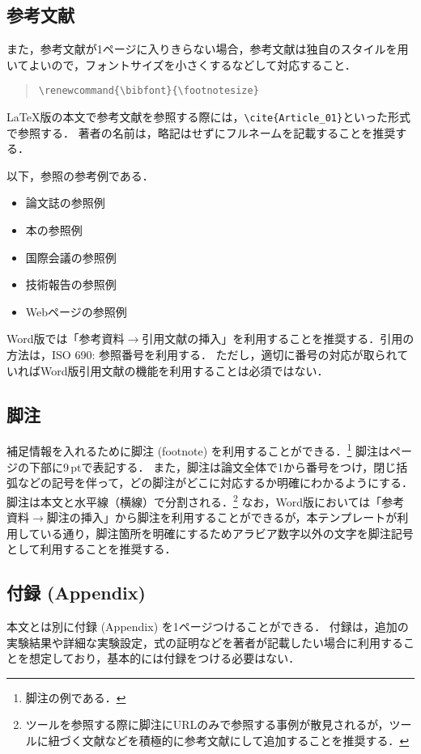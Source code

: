 \documentclass[
  platex, dvipdfmx,  %
]{nlp2024}
\begin{document}
\subsection{参考文献}



%
また，参考文献が1ページに入りきらない場合，参考文献は独自のスタイルを用いてよいので，フォントサイズを小さくするなどして対応すること．
\begin{quote}
\verb|\renewcommand{\bibfont}{\footnotesize}|
\end{quote}



LaTeX版の本文で参考文献を参照する際には，\verb|\cite{Article_01}|といった形式で参照する．
%
著者の名前は，略記はせずにフルネームを記載することを推奨する．

以下，参照の参考例である．
\begin{itemize}
\item 論文誌の参照例 \cite{Article_01}
\item 本の参照例 \cite{Book_02}
\item 国際会議の参照例 \cite{Inproc_03}
\item 技術報告の参照例 \cite{Techrep_05}
\item Webページの参照例 \cite{Web_06}
\end{itemize}

Word版では「参考資料$\xrightarrow{}$引用文献の挿入」を利用することを推奨する．引用の方法は，ISO 690: 参照番号を利用する．
ただし，適切に番号の対応が取られていればWord版引用文献の機能を利用することは必須ではない．


\subsection{脚注}
補足情報を入れるために脚注 (footnote) を利用することができる．\footnote{脚注の例である．}
脚注はページの下部に9\,ptで表記する．
また，脚注は論文全体で1から番号をつけ，閉じ括弧などの記号を伴って，どの脚注がどこに対応するか明確にわかるようにする．
脚注は本文と水平線（横線）で分割される．\footnote{ツールを参照する際に脚注にURLのみで参照する事例が散見されるが，ツールに紐づく文献などを積極的に参考文献にして追加することを推奨する．}
なお，Word版においては「参考資料$\xrightarrow{}$脚注の挿入」から脚注を利用することができるが，本テンプレートが利用している通り，脚注箇所を明確にするためアラビア数字以外の文字を脚注記号として利用することを推奨する．



\subsection{付録 (Appendix)}
\label{sec:appendix}
本文とは別に付録 (Appendix) を1ページつけることができる．
付録は，追加の実験結果や詳細な実験設定，式の証明などを著者が記載したい場合に利用することを想定しており，基本的には付録をつける必要はない．
\end{document}
